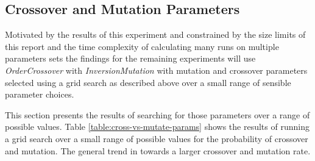 \documentclass[journal]{IEEEtran}
\begin{document}
\subsection{Crossover and Mutation Parameters}
\label{subsec:crossover-mutation-parameters}
Motivated by the results of this experiment and constrained by the size limits of this report and the time complexity of calculating many runs on multiple parameters sets the findings for the remaining experiments will use \textit{OrderCrossover} with \textit{InversionMutation} with mutation and crossover parameters selected using a grid search as described above over a small range of sensible parameter choices.

This section presents the results of searching for those parameters over a range of possible values. Table \ref{table:cross-vs-mutate-params} shows the results of running a grid search over a small range of possible values for the probability of crossover and mutation. The general trend in towards a larger crossover and mutation rate.

\begin{table}[t]
\centering

\caption{Median fitness of running each of the different types parameter values for population size and tournament size with \textit{TournamentSelection}. For all tests \textit{OrderCrossover} and \textit{InversionMutation} are used. All runs used a $0.9$ crossover rate and a $0.2$ mutation rate based on the results in section \ref{subsec:crossover-mutation-parameters}. Each was run for a total of $1000$ generations.}
\label{table:selection-vs-pop-size}
\end{table}

\begin{table}[t]
\centering

\caption{Median fitness of running each of the different population sizes with \textit{RouletteWheelSelection}. For all tests \textit{OrderCrossover} and \textit{InversionMutation} are used. All runs used a $0.9$ crossover rate and a $0.2$ mutation rate based on the results in section \ref{subsec:crossover-mutation-parameters}. Each was run for a total of $1000$ generations. No results successfully converged}
\label{table:selection-vs-pop-size2}
\end{table}
\end{document}
